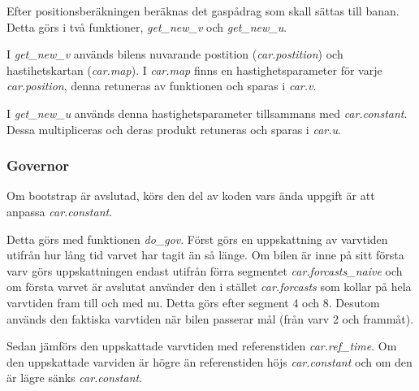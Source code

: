 Efter positionsberäkningen beräknas det gaspådrag som skall sättas till banan. Detta görs i två
funktioner, \emph{get\_new\_v} och \emph{get\_new\_u}.
 
I \emph{get\_new\_v} används bilens nuvarande postition (\emph{car.postition})
och hastihetskartan (\emph{car.map}). I \emph{car.map} finns en
hastighetsparameter för varje \emph{car.position}, denna retuneras av funktionen
och sparas i \emph{car.v}.
 
I \emph{get\_new\_u} används denna hastighetsparameter tillsammans med
\emph{car.constant}. Dessa multipliceras och deras produkt retuneras och sparas
i \emph{car.u}.

\subsubsection{Governor}

Om bootstrap är avslutad, körs den del av koden vars ända uppgift är att 
anpassa \emph{car.constant}. 

Detta görs med funktionen \emph{do\_gov}.  Först görs en uppskattning av varvtiden utifrån hur lång tid varvet har tagit än
så länge. Om bilen är inne på sitt första varv görs uppskattningen endast
utifrån förra segmentet \emph{car.forcasts\_naive} och om första varvet är
avslutat använder den i stället \emph{car.forcasts} som kollar på hela varvtiden
fram till och med nu. Detta görs efter segment 4 och 8. Desutom används den
faktiska varvtiden när bilen passerar mål (från varv 2 och frammåt).
 
Sedan jämförs den uppskattade varvtiden med referenstiden \emph{car.ref\_time}.
Om den uppskattade varviden är högre än referenstiden höjs \emph{car.constant}
och om den är lägre sänks \emph{car.constant}.

